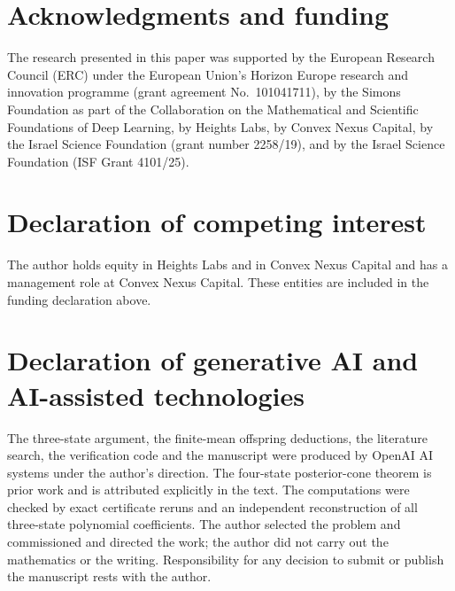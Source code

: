 \section*{Acknowledgments and funding}
The research presented in this paper was supported by the European Research Council (ERC) under the European Union's Horizon Europe research and innovation programme (grant agreement No.~101041711), by the Simons Foundation as part of the Collaboration on the Mathematical and Scientific Foundations of Deep Learning, by Heights Labs, by Convex Nexus Capital, by the Israel Science Foundation (grant number 2258/19), and by the Israel Science Foundation (ISF Grant 4101/25).

\section*{Declaration of competing interest}
The author holds equity in Heights Labs and in Convex Nexus Capital and has a management role at Convex Nexus Capital. These entities are included in the funding declaration above.

\section*{Declaration of generative AI and AI-assisted technologies}
The three-state argument, the finite-mean offspring deductions, the literature search, the verification code and the manuscript were produced by OpenAI AI systems under the author's direction. The four-state posterior-cone theorem is prior work and is attributed explicitly in the text. The computations were checked by exact certificate reruns and an independent reconstruction of all three-state polynomial coefficients. The author selected the problem and commissioned and directed the work; the author did not carry out the mathematics or the writing. Responsibility for any decision to submit or publish the manuscript rests with the author.
